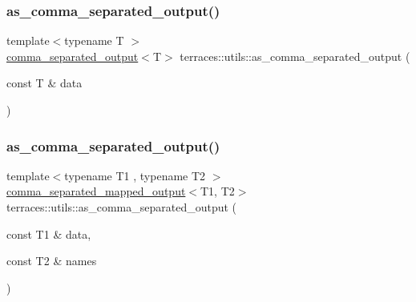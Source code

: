 \subsubsection{\texorpdfstring{as\+\_\+comma\+\_\+separated\+\_\+output()}{as\_comma\_separated\_output()}\hspace{0.1cm}{\footnotesize\ttfamily [1/3]}}
{\footnotesize\ttfamily template$<$typename T $>$ \\
\hyperlink{structterraces_1_1utils_1_1comma__separated__output}{comma\+\_\+separated\+\_\+output}$<$T$>$ terraces\+::utils\+::as\+\_\+comma\+\_\+separated\+\_\+output (\begin{DoxyParamCaption}\item[{const T \&}]{data }\end{DoxyParamCaption})}

\mbox{\label{namespaceterraces_1_1utils_ac87c5dc23381a9d53a4ceb4f41070e40}} 
\subsubsection{\texorpdfstring{as\+\_\+comma\+\_\+separated\+\_\+output()}{as\_comma\_separated\_output()}\hspace{0.1cm}{\footnotesize\ttfamily [2/3]}}
{\footnotesize\ttfamily template$<$typename T1 , typename T2 $>$ \\
\hyperlink{structterraces_1_1utils_1_1comma__separated__mapped__output}{comma\+\_\+separated\+\_\+mapped\+\_\+output}$<$T1, T2$>$ terraces\+::utils\+::as\+\_\+comma\+\_\+separated\+\_\+output (\begin{DoxyParamCaption}\item[{const T1 \&}]{data,  }\item[{const T2 \&}]{names }\end{DoxyParamCaption})}

\mbox{\label{namespaceterraces_1_1utils_a1b6a6d4d742c0466921e62d127c51df9}} 
